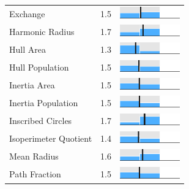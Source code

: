 \begin{table}
\begin{tabular}{l rm{7em}}
Exchange               &   1.5 &     \includegraphics[width=7em]{mini_hist/TN_2016_exchange} \\
Harmonic Radius        &   1.7 &  \includegraphics[width=7em]{mini_hist/TN_2016_harm_radius} \\
Hull Area              &   1.3 &       \includegraphics[width=7em]{mini_hist/TN_2016_hull_a} \\
Hull Population        &   1.5 &       \includegraphics[width=7em]{mini_hist/TN_2016_hull_p} \\
Inertia Area           &   1.5 &    \includegraphics[width=7em]{mini_hist/TN_2016_inertia_a} \\
Inertia Population     &   1.5 &    \includegraphics[width=7em]{mini_hist/TN_2016_inertia_p} \\
Inscribed Circles      &   1.7 &    \includegraphics[width=7em]{mini_hist/TN_2016_ehrenburg} \\
Isoperimeter Quotient  &   1.4 &       \includegraphics[width=7em]{mini_hist/TN_2016_polsby} \\
Mean Radius            &   1.6 &  \includegraphics[width=7em]{mini_hist/TN_2016_mean_radius} \\
Path Fraction          &   1.5 &    \includegraphics[width=7em]{mini_hist/TN_2016_path_frac} \\

\end{tabular}
\end{table}
